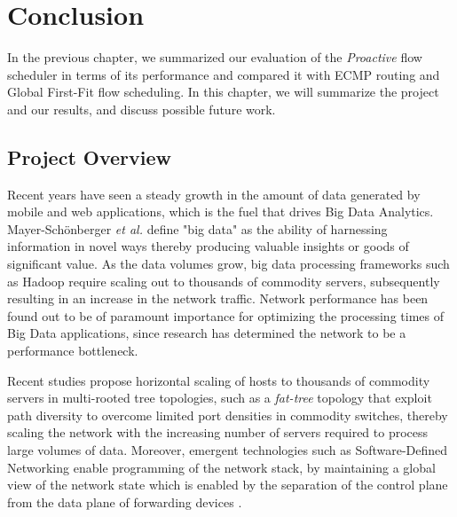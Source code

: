 \chapter{Conclusion} \label{chap:conc}

In the previous chapter, we summarized our evaluation of the \textit{Proactive} flow scheduler in terms of its  performance and compared it with ECMP routing and Global First-Fit flow scheduling. In this chapter, we will summarize the project and our results, and discuss possible future work.

\section{Project Overview}

Recent years have seen a steady growth in the amount of data generated by mobile and web applications, which is the fuel that drives Big Data Analytics. Mayer-Sch{\"o}nberger \textit{et al.} \cite{mayer2013big} define "big data" as the ability of harnessing information in novel ways thereby producing valuable insights or goods of significant value. As the data volumes grow, big data processing frameworks such as Hadoop \cite{HadoopWeb} require scaling out to thousands of commodity servers, subsequently resulting in an increase in the network traffic. Network performance has been found out to be of paramount importance for optimizing the processing times of Big Data applications, since research \cite{al2010hedera, greenberg2009vl2,guo2008dcell} has determined the network to be a performance bottleneck.

Recent studies \cite{al2008scalable, greenberg2009vl2, guo2008dcell,guo2009bcube} propose horizontal scaling of hosts to thousands of commodity servers in multi-rooted tree topologies, such as a \textit{fat-tree} topology that exploit path diversity to overcome limited port densities in commodity switches, thereby scaling the network with the increasing number of servers required to process large volumes of data. Moreover, emergent technologies such as Software-Defined Networking enable programming of the network stack, by maintaining a global view of the network state which is enabled by the separation of the control plane from the data plane of forwarding devices \cite{lantz2010network}. 

